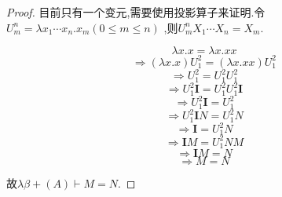 
\begin{proof}

目前只有一个变元,需要使用投影算子来证明.令$U_m^n= \lambda x_1 \cdots x_n.x_m(0 \le m \le n)$ ,则$U_m^n X_1 \cdots X_n = X_m$.


$$ \lambda x.x =\lambda x.xx $$
$$ \Rightarrow (\lambda x.x)U_1^2 =(\lambda x.xx)U_1^2 $$
$$ \Rightarrow U_1^2 =U_1^2 U_1^2 $$
$$ \Rightarrow U_1^2 \mathbf{I} =U_1^2 U_1^2 \mathbf{I}$$
$$ \Rightarrow U_1^2 \mathbf{I} =U_1^2 $$
$$ \Rightarrow U_1^2 \mathbf{I}N =U_1^2 N $$
$$ \Rightarrow \mathbf{I} =U_1^2 N $$
$$ \Rightarrow \mathbf{I}M =U_1^2 N M $$
$$ \Rightarrow \mathbf{I}M =N $$
$$ \Rightarrow M =N $$

故$\lambda \beta + (A) \vdash M=N$.

\end{proof}